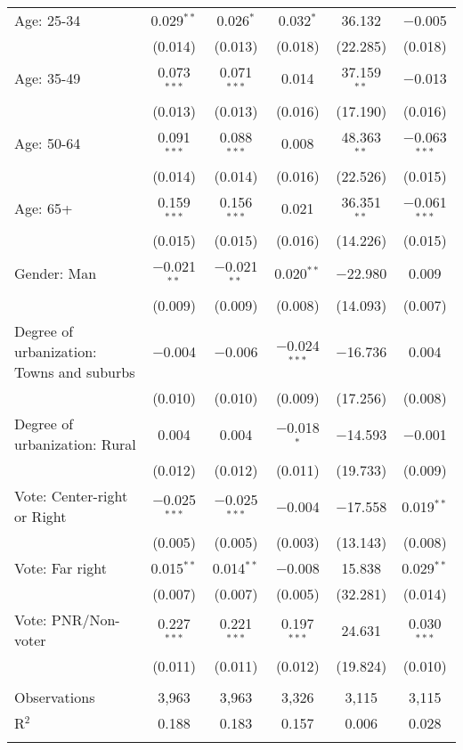 \begin{tabular}{@{\extracolsep{5pt}}lccccc}
  Age: 25\mbox{-}34 & 0.029$^{**}$ & 0.026$^{*}$ & 0.032$^{*}$ & 36.132 & $-$0.005 \\ 
  & (0.014) & (0.013) & (0.018) & (22.285) & (0.018) \\ 
  Age: 35\mbox{-}49 & 0.073$^{***}$ & 0.071$^{***}$ & 0.014 & 37.159$^{**}$ & $-$0.013 \\ 
  & (0.013) & (0.013) & (0.016) & (17.190) & (0.016) \\ 
  Age: 50\mbox{-}64 & 0.091$^{***}$ & 0.088$^{***}$ & 0.008 & 48.363$^{**}$ & $-$0.063$^{***}$ \\ 
  & (0.014) & (0.014) & (0.016) & (22.526) & (0.015) \\ 
  Age: 65+ & 0.159$^{***}$ & 0.156$^{***}$ & 0.021 & 36.351$^{**}$ & $-$0.061$^{***}$ \\ 
  & (0.015) & (0.015) & (0.016) & (14.226) & (0.015) \\ 
  Gender: Man & $-$0.021$^{**}$ & $-$0.021$^{**}$ & 0.020$^{**}$ & $-$22.980 & 0.009 \\ 
  & (0.009) & (0.009) & (0.008) & (14.093) & (0.007) \\ 
  Degree of urbanization: Towns and suburbs & $-$0.004 & $-$0.006 & $-$0.024$^{***}$ & $-$16.736 & 0.004 \\ 
  & (0.010) & (0.010) & (0.009) & (17.256) & (0.008) \\ 
  Degree of urbanization: Rural & 0.004 & 0.004 & $-$0.018$^{*}$ & $-$14.593 & $-$0.001 \\ 
  & (0.012) & (0.012) & (0.011) & (19.733) & (0.009) \\ 
  Vote: Center\mbox{-}right or Right & $-$0.025$^{***}$ & $-$0.025$^{***}$ & $-$0.004 & $-$17.558 & 0.019$^{**}$ \\ 
  & (0.005) & (0.005) & (0.003) & (13.143) & (0.008) \\ 
  Vote: Far right & 0.015$^{**}$ & 0.014$^{**}$ & $-$0.008 & 15.838 & 0.029$^{**}$ \\ 
  & (0.007) & (0.007) & (0.005) & (32.281) & (0.014) \\ 
  Vote: PNR\slash Non\mbox{-}voter & 0.227$^{***}$ & 0.221$^{***}$ & 0.197$^{***}$ & 24.631 & 0.030$^{***}$ \\ 
  & (0.011) & (0.011) & (0.012) & (19.824) & (0.010) \\ 
 \hline \\[-1.8ex] 

Observations & 3,963 & 3,963 & 3,326 & 3,115 & 3,115 \\ 
R$^{2}$ & 0.188 & 0.183 & 0.157 & 0.006 & 0.028 \\ 
\hline 
\hline \\[-1.8ex] 
\end{tabular} 